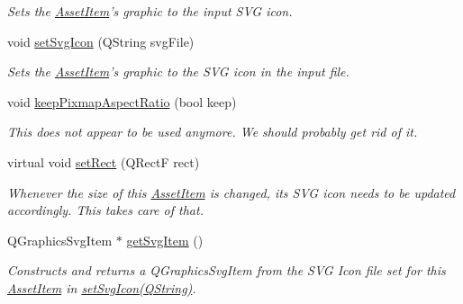 \begin{DoxyCompactItemize}
\begin{DoxyCompactList}\small\item\em Sets the \hyperlink{class_asset_item}{Asset\-Item}'s graphic to the input S\-V\-G icon. \end{DoxyCompactList}\item 
\hypertarget{class_asset_item_ae84ba8a60491a22b6436f8fad6116d4b}{void \hyperlink{class_asset_item_ae84ba8a60491a22b6436f8fad6116d4b}{set\-Svg\-Icon} (Q\-String svg\-File)}\label{class_asset_item_ae84ba8a60491a22b6436f8fad6116d4b}

\begin{DoxyCompactList}\small\item\em Sets the \hyperlink{class_asset_item}{Asset\-Item}'s graphic to the S\-V\-G icon in the input file. \end{DoxyCompactList}\item 
\hypertarget{class_asset_item_ad7cef0e33de09351eaaf8cd6f84ca99f}{void \hyperlink{class_asset_item_ad7cef0e33de09351eaaf8cd6f84ca99f}{keep\-Pixmap\-Aspect\-Ratio} (bool keep)}\label{class_asset_item_ad7cef0e33de09351eaaf8cd6f84ca99f}

\begin{DoxyCompactList}\small\item\em This does not appear to be used anymore. We should probably get rid of it. \end{DoxyCompactList}\item 
\hypertarget{class_asset_item_a6242be3a7cc3977aff6d28c8b27b4eb3}{virtual void \hyperlink{class_asset_item_a6242be3a7cc3977aff6d28c8b27b4eb3}{set\-Rect} (Q\-Rect\-F rect)}\label{class_asset_item_a6242be3a7cc3977aff6d28c8b27b4eb3}

\begin{DoxyCompactList}\small\item\em Whenever the size of this \hyperlink{class_asset_item}{Asset\-Item} is changed, its S\-V\-G icon needs to be updated accordingly. This takes care of that. \end{DoxyCompactList}\item 
Q\-Graphics\-Svg\-Item $\ast$ \hyperlink{class_asset_item_a52ff023e5eb2b68d38a87cc49cdfb3f7}{get\-Svg\-Item} ()
\begin{DoxyCompactList}\small\item\em Constructs and returns a Q\-Graphics\-Svg\-Item from the S\-V\-G Icon file set for this \hyperlink{class_asset_item}{Asset\-Item} in \hyperlink{class_asset_item_ae84ba8a60491a22b6436f8fad6116d4b}{set\-Svg\-Icon(\-Q\-String)}. \end{DoxyCompactList}\end{DoxyCompactItemize}
